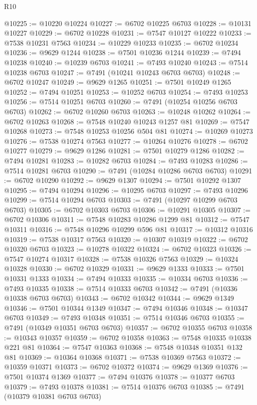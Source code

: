 \begin{lexlean}{R10}
\begin{coremodule}
{{{{{{{{{{{{{{{{{{{{{{{{{{{{{{{{{{{{{{{{{{{{{{{{{{{{{{{{{{{{{{{{{{{{{{{{{{{{{{{{{{{{@10225 := @10220 @10224
@10227 := @6702 @10225 @6703
@10228 := @10131 @10227
@10229 := @6702 @10228
@10231 := @7547 @10127 @10222
@10233 := @7538 @10231 @7563
@10234 := @10229 @10233
@10235 := @6702 @10234
@10236 := @9629 @1244
@10238 := @7501 @10236 @1244
@10239 := @7494 @10238
@10240 := @10239 @6703
@10241 := @7493 @10240
@10243 := @7514 @10238 @6703
@10247 := @7491 (@10241 @10243 @6703 @6703)
@10248 := @6702 @10247
@10249 := @9629 @1265
@10251 := @7501 @10249 @1265
@10252 := @7494 @10251
@10253 := @10252 @6703
@10254 := @7493 @10253
@10256 := @7514 @10251 @6703
@10260 := @7491 (@10254 @10256 @6703 @6703)
@10262 := @6702 @10260 @6703
@10263 := @10248 @10262
@10264 := @6702 @10263
@10268 := @7548 @10240 @10243 @1257 @81
@10269 := @7547 @10268
@10273 := @7548 @10253 @10256 @504 @81
@10274 := @10269 @10273
@10276 := @7538 @10274 @7563
@10277 := @10264 @10276
@10278 := @6702 @10277
@10279 := @9629 @1286
@10281 := @7501 @10279 @1286
@10282 := @7494 @10281
@10283 := @10282 @6703
@10284 := @7493 @10283
@10286 := @7514 @10281 @6703
@10290 := @7491 (@10284 @10286 @6703 @6703)
@10291 := @6702 @10290
@10292 := @9629 @1307
@10294 := @7501 @10292 @1307
@10295 := @7494 @10294
@10296 := @10295 @6703
@10297 := @7493 @10296
@10299 := @7514 @10294 @6703
@10303 := @7491 (@10297 @10299 @6703 @6703)
@10305 := @6702 @10303 @6703
@10306 := @10291 @10305
@10307 := @6702 @10306
@10311 := @7548 @10283 @10286 @1299 @81
@10312 := @7547 @10311
@10316 := @7548 @10296 @10299 @596 @81
@10317 := @10312 @10316
@10319 := @7538 @10317 @7563
@10320 := @10307 @10319
@10322 := @6702 @10320 @6703
@10323 := @10278 @10322
@10324 := @6702 @10323
@10326 := @7547 @10274 @10317
@10328 := @7538 @10326 @7563
@10329 := @10324 @10328
@10330 := @6702 @10329
@10331 := @9629 @1333
@10333 := @7501 @10331 @1333
@10334 := @7494 @10333
@10335 := @10334 @6703
@10336 := @7493 @10335
@10338 := @7514 @10333 @6703
@10342 := @7491 (@10336 @10338 @6703 @6703)
@10343 := @6702 @10342
@10344 := @9629 @1349
@10346 := @7501 @10344 @1349
@10347 := @7494 @10346
@10348 := @10347 @6703
@10349 := @7493 @10348
@10351 := @7514 @10346 @6703
@10355 := @7491 (@10349 @10351 @6703 @6703)
@10357 := @6702 @10355 @6703
@10358 := @10343 @10357
@10359 := @6702 @10358
@10363 := @7548 @10335 @10338 @221 @81
@10364 := @7547 @10363
@10368 := @7548 @10348 @10351 @132 @81
@10369 := @10364 @10368
@10371 := @7538 @10369 @7563
@10372 := @10359 @10371
@10373 := @6702 @10372
@10374 := @9629 @1369
@10376 := @7501 @10374 @1369
@10377 := @7494 @10376
@10378 := @10377 @6703
@10379 := @7493 @10378
@10381 := @7514 @10376 @6703
@10385 := @7491 (@10379 @10381 @6703 @6703)
}}}}}}}}}}}}}}}}}}}}}}}}}}}}}}}}}}}}}}}}}}}}}}}}}}}}}}}}}}}}}}}}}}}}}}}}}}}}}}}}}}}}
\end{coremodule}
\end{lexlean}
